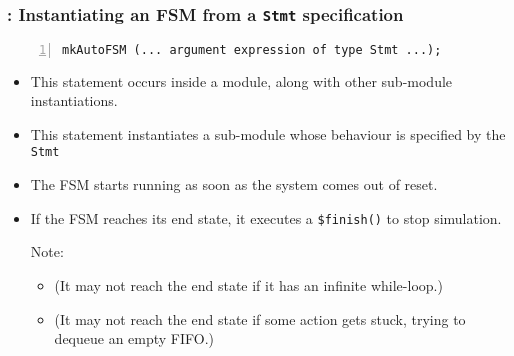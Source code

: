 \begin{frame}[fragile]
\frametitle{{\BSV}: Instantiating an FSM from a {\tt Stmt} specification}

\footnotesize

\begin{Verbatim}[frame=single, numbers=left]
   mkAutoFSM (... argument expression of type Stmt ...);
\end{Verbatim}

\begin{itemize}
        
 \item This statement occurs inside a module, along with other sub-module instantiations.

 \item This statement instantiates a sub-module whose behaviour is specified by the {\tt Stmt}

 \item The FSM starts running as soon as the system comes out of reset.

 \item If the FSM reaches its end state, it executes a {\tt \$finish()} to stop simulation.

       Note:
       \begin{itemize}
        \item (It may not reach the end state if it has an infinite while-loop.)

        \item (It may not reach the end state if some action gets stuck,
              {\eg} trying to dequeue an empty FIFO.)
       \end{itemize}
\end{itemize}

\end{frame}



